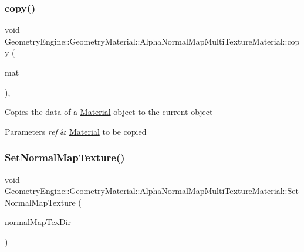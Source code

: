 \subsubsection{\texorpdfstring{copy()}{copy()}}
{\footnotesize\ttfamily void Geometry\+Engine\+::\+Geometry\+Material\+::\+Alpha\+Normal\+Map\+Multi\+Texture\+Material\+::copy (\begin{DoxyParamCaption}\item[{const \mbox{\hyperlink{class_geometry_engine_1_1_geometry_material_1_1_alpha_normal_map_multi_texture_material}{Alpha\+Normal\+Map\+Multi\+Texture\+Material}} \&}]{mat }\end{DoxyParamCaption})\hspace{0.3cm}{\ttfamily [protected]}, {\ttfamily [virtual]}}

Copies the data of a \mbox{\hyperlink{class_geometry_engine_1_1_geometry_material_1_1_material}{Material}} object to the current object 
\begin{DoxyParams}{Parameters}
{\em ref} & \mbox{\hyperlink{class_geometry_engine_1_1_geometry_material_1_1_material}{Material}} to be copied \\
\hline
\end{DoxyParams}
\mbox{\label{class_geometry_engine_1_1_geometry_material_1_1_alpha_normal_map_multi_texture_material_aeb7a6dd47e712e0d6c85d37e7158a615}} 
\subsubsection{\texorpdfstring{SetNormalMapTexture()}{SetNormalMapTexture()}}
{\footnotesize\ttfamily void Geometry\+Engine\+::\+Geometry\+Material\+::\+Alpha\+Normal\+Map\+Multi\+Texture\+Material\+::\+Set\+Normal\+Map\+Texture (\begin{DoxyParamCaption}\item[{const std\+::string \&}]{normal\+Map\+Tex\+Dir }\end{DoxyParamCaption})}

